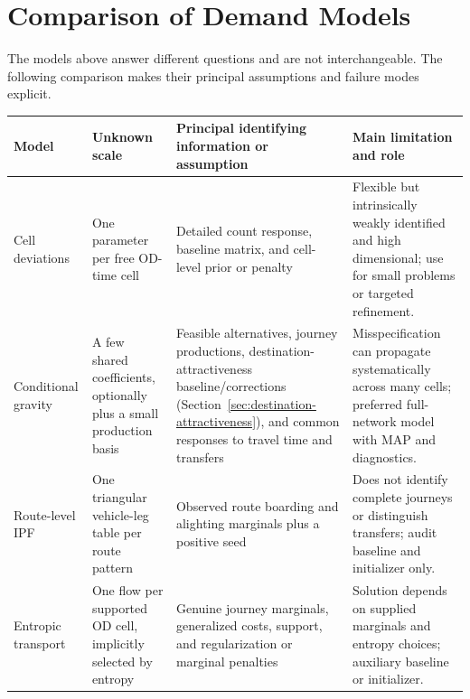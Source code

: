 
\section{Comparison of Demand Models}
\label{sec:demand-model-comparison}

The models above answer different questions and are not interchangeable.  The
following comparison makes their principal assumptions and failure modes
explicit.

\begin{center}
\small
\begin{tabular}{>{\raggedright\arraybackslash}p{2.4cm}
                >{\raggedright\arraybackslash}p{3.1cm}
                >{\raggedright\arraybackslash}p{4.8cm}
                >{\raggedright\arraybackslash}p{5.0cm}}
\hline
Model & Unknown scale & Principal identifying information or assumption & Main limitation and role \\
\hline
Cell deviations
& One parameter per free OD-time cell
& Detailed count response, baseline matrix, and cell-level prior or penalty
& Flexible but intrinsically weakly identified and high dimensional; use for small problems or targeted refinement. \\

Conditional gravity
& A few shared coefficients, optionally plus a small production basis
& Feasible alternatives, journey productions, destination-attractiveness baseline/corrections (Section~\ref{sec:destination-attractiveness}), and common responses to travel time and transfers
& Misspecification can propagate systematically across many cells; preferred full-network model with MAP and diagnostics. \\

Route-level IPF
& One triangular vehicle-leg table per route pattern
& Observed route boarding and alighting marginals plus a positive seed
& Does not identify complete journeys or distinguish transfers; audit baseline and initializer only. \\

Entropic transport
& One flow per supported OD cell, implicitly selected by entropy
& Genuine journey marginals, generalized costs, support, and regularization or marginal penalties
& Solution depends on supplied marginals and entropy choices; auxiliary baseline or initializer. \\
\hline
\end{tabular}
\end{center}

